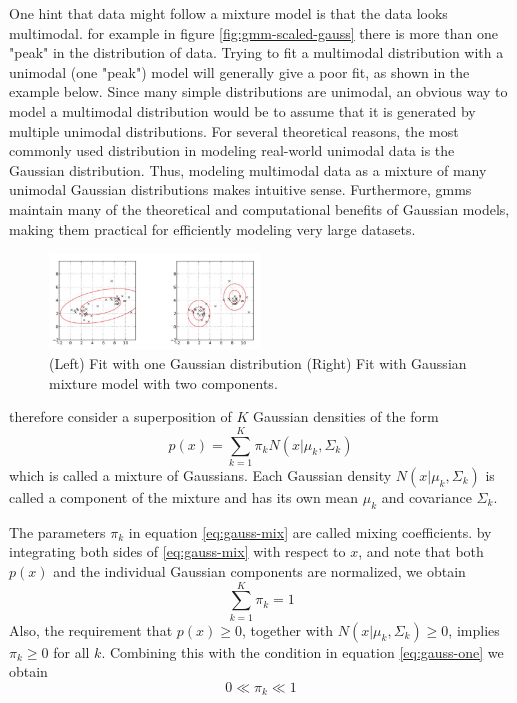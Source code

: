 \documentclass[12pt, a4paper, twoside]{report}
\begin{document}
One hint that data might follow a mixture model is that the data looks multimodal. for example in figure \ref{fig:gmm-scaled-gauss} there is more than one "peak" in the distribution of data. Trying to fit a multimodal distribution with a unimodal (one "peak") model will generally give a poor fit, as shown in the example below. Since many simple distributions are unimodal, an obvious way to model a multimodal distribution would be to assume that it is generated by multiple unimodal distributions. For several theoretical reasons, the most commonly used distribution in modeling real-world unimodal data is the Gaussian distribution. Thus, modeling multimodal data as a mixture of many unimodal Gaussian distributions makes intuitive sense. Furthermore, \acrshort{gmm}s maintain many of the theoretical and computational benefits of Gaussian models, making them practical for efficiently modeling very large datasets.
\begin{figure}[!h]
	\centering
	\includegraphics[width=0.5\textwidth]
	{images/chapter4/gmm-one-mixture}
	\caption{(Left) Fit with one Gaussian distribution (Right) Fit with Gaussian mixture model with two components.}
	\label{fig:gmm-one-mixture}
\end{figure}

therefore consider a superposition of $K$ Gaussian densities of the form
\begin{equation}
p(x) = \sum_{k=1}^{K} \pi_k N(x|\mu_k,\Sigma_k)
\label{eq:gauss-mix}
\end{equation}
which is called a mixture of Gaussians. Each Gaussian density $N(x|\mu_k,\Sigma_k)$ is called a component of the mixture and has its own mean $\mu_k$ and covariance $\Sigma_k$.

The parameters $\pi_k$ in equation \ref{eq:gauss-mix} are called mixing coefficients. by integrating both sides of \ref{eq:gauss-mix} with respect to $x$, and note that both $p(x)$ and the individual Gaussian components are normalized, we obtain
\begin{equation}
\sum_{k=1}^{K} \pi_k = 1
\label{eq:gauss-one}
\end{equation}
Also, the requirement that $p(x) \geq 0$, together with $N(x|\mu_k,\Sigma_k) \geq 0$, implies $\pi_k \geq 0$ for all $k$. Combining this with the condition in equation \ref{eq:gauss-one} we obtain
\begin{equation}
0 \ll \pi_k \ll 1
\end{equation}
\end{document}
